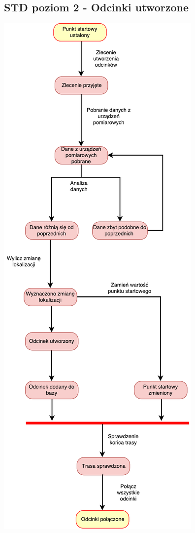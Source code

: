 \documentclass[11pt]{article}
\begin{document}
	\subsection{STD poziom 2 - Odcinki utworzone}
	\begin{center}
		\includegraphics[scale=0.75]{STD4.pdf}
	\end{center}
	\newpage
\end{document}
